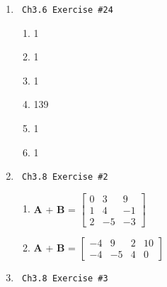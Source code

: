 \documentclass[12pt]{article}
\begin{document}
\begin{enumerate}
    \newpage

    \item \begin{verbatim} Ch3.6 Exercise #24 \end{verbatim}
        \begin{enumerate}[label=\alph*]
            \item 1
            \item 1
            \item 1
            \item 139
            \item 1
            \item 1
        \end{enumerate}
    \item \begin{verbatim} Ch3.8 Exercise #2 \end{verbatim}
        \begin{enumerate}[label=\alph*]
            \item 
                \textbf{A} + \textbf{B} = 
                $\begin{bmatrix}
                    0 & 3 & 9 \\
                    1 & 4 & -1 \\
                    2 & -5 & -3    
                \end{bmatrix} $
            \item 
                \textbf{A} + \textbf{B} =
                $\begin{bmatrix}
                    -4 & 9 & 2 & 10 \\
                    -4 & -5 & 4 & 0   
                \end{bmatrix} $
        \end{enumerate}
    \item \begin{verbatim} Ch3.8 Exercise #3 \end{verbatim}
\end{enumerate}
\end{document}
